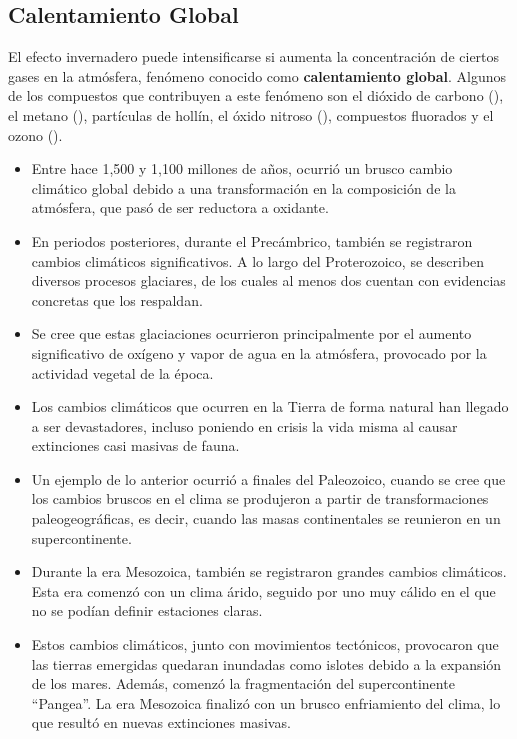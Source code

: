 \subsection{Calentamiento Global}\label{cglobal}
El efecto invernadero puede intensificarse si aumenta la concentración de ciertos gases en la atmósfera, fenómeno conocido como \textbf{calentamiento global}. Algunos de los compuestos que contribuyen a este fenómeno son el dióxido de carbono (), el metano (), partículas de hollín, el óxido nitroso (), compuestos fluorados y el ozono ().
\begin{itemize}
\item Entre hace 1,500 y 1,100 millones de años, ocurrió un brusco cambio climático global debido a una transformación en la composición de la atmósfera, que pasó de ser reductora a oxidante.
\item En periodos posteriores, durante el Precámbrico, también se registraron cambios climáticos significativos. A lo largo del Proterozoico, se describen diversos procesos glaciares, de los cuales al menos dos cuentan con evidencias concretas que los respaldan.
\item Se cree que estas glaciaciones ocurrieron principalmente por el aumento significativo de oxígeno y vapor de agua en la atmósfera, provocado por la actividad vegetal de la época.
\item Los cambios climáticos que ocurren en la Tierra de forma natural han llegado a ser devastadores, incluso poniendo en crisis la vida misma al causar extinciones casi masivas de fauna.
\item Un ejemplo de lo anterior ocurrió a finales del Paleozoico, cuando se cree que los cambios bruscos en el clima se produjeron a partir de transformaciones paleogeográficas, es decir, cuando las masas continentales se reunieron en un supercontinente.
\item Durante la era Mesozoica, también se registraron grandes cambios climáticos. Esta era comenzó con un clima árido, seguido por uno muy cálido en el que no se podían definir estaciones claras.
\item Estos cambios climáticos, junto con movimientos tectónicos, provocaron que las tierras emergidas quedaran inundadas como islotes debido a la expansión de los mares. Además, comenzó la fragmentación del supercontinente ``Pangea''. La era Mesozoica finalizó con un brusco enfriamiento del clima, lo que resultó en nuevas extinciones masivas.
\end{itemize}


